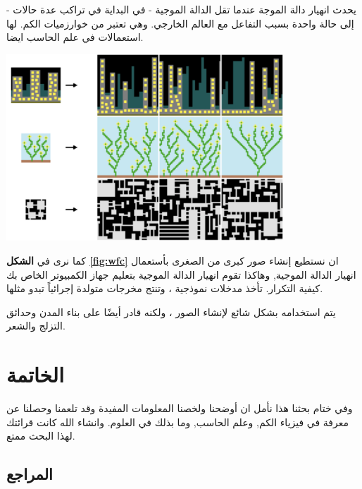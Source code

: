 \documentclass[a4paper,12pt,openright,twoside]{book}
\begin{document}
يحدث انهيار دالة الموجة عندما تقل الدالة الموجية - في البداية في تراكب عدة حالات - إلى حالة واحدة بسبب التفاعل مع العالم الخارجي. وهي تعتبر من خوارزميات الكم. لها استعمالات في علم الحاسب ايضا.

\begin{center}
	\includegraphics[width=\textwidth, height=7cm]{wfc-examples.png}
	\label{fig:wfc}
\end{center} \newpage

كما نرى في 
\textbf{الشكل \ref{fig:wfc}} 
ان نستطيع إنشاء صور كبرى من الصغرى بأستعمال انهيار الدالة الموجية, وهاكذا
تقوم انهيار الدالة الموجية بتعليم جهاز الكمبيوتر الخاص بك كيفية التكرار. تأخذ مدخلات نموذجية ، وتنتج مخرجات متولدة إجرائياً تبدو مثلها.

يتم استخدامه بشكل شائع لإنشاء الصور ، ولكنه قادر أيضًا على بناء المدن وحدائق التزلج والشعر.

\newpage

\chapter{الخاتمة}

\begin{center}
	
	وفي ختام بحثنا هذا نأمل ان أوضحنا ولخصنا المعلومات المفيدة وقد تلعمنا وحصلنا عن معرفة في فيزياء الكم, وعلم الحاسب, وما بذلك في العلوم. وانشاء الله كانت قرائتك  لهذا البحث ممتع.

\end{center}

\vspace*{0.3in}
\section{المراجع}
\end{document}
